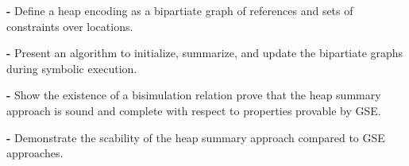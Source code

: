 






\begin{description}

\item\textbf{-} Define a heap encoding as a bipartiate graph of
  references and sets of constraints over locations.


\item\textbf{-} Present an algorithm to initialize, summarize, and
  update the bipartiate graphs during symbolic execution.

\item\textbf{-} Show the existence of a bisimulation relation prove
  that the heap summary approach is sound and complete with respect to
  properties provable by GSE.

\item\textbf{-} Demonstrate the scability of the heap summary approach
  compared to GSE approaches.

\end{description}



